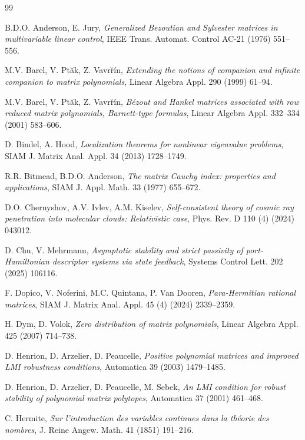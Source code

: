 \documentclass[12pt,reqno]{amsart}
\theoremstyle{plain}
\numberwithin{equation}{section}
\theoremstyle{remark}
\begin{document}
 

\begin{thebibliography}{99}

 B.D.O. Anderson, E. Jury, \textit{Generalized Bezoutian and Sylvester matrices in multivariable linear control}, IEEE Trans. Automat. Control AC-21 (1976) 551--556.

M.V. Barel, V. Pt\u{a}k, Z. Vavr\u{r}\'{i}n, \textit{Extending the notions of companion and infinite companion to matrix polynomials},
Linear Algebra Appl. 290 (1999) 61--94.

M.V. Barel, V. Pt\u{a}k, Z. Vavr\u{r}\'{i}n, 
\textit{B\'{e}zout and Hankel matrices associated with row reduced matrix polynomials, Barnett-type formulas}, Linear Algebra Appl. 332--334 (2001)  583--606.

D. Bindel, A. Hood,  \textit{Localization theorems for nonlinear eigenvalue
problems}, SIAM J. Matrix Anal. Appl. 34 (2013) 1728--1749.

 R.R. Bitmead, B.D.O. Anderson, \textit{The matrix Cauchy index: properties and
applications}, SIAM J. Appl. Math. 33 (1977) 655--672.


  D.O. Chernyshov, A.V. Ivlev, A.M. Kiselev,   \textit{Self-consistent theory of cosmic ray penetration into molecular clouds: Relativistic case}, Phys. Rev. D 110 (4) (2024) 043012.

 D. Chu, V. Mehrmann, \textit{Asymptotic stability and strict passivity of port-Hamiltonian descriptor systems via state feedback}, Systems Control Lett. 202 (2025) 106116.

 F. Dopico, V. Noferini, M.C. Quintana, P. Van Dooren, \textit{Para-Hermitian rational matrices}, SIAM J. Matrix Anal. Appl. 45 (4) (2024) 2339--2359.

H. Dym, D. Volok, \textit{Zero distribution of matrix polynomials}, Linear Algebra Appl. 425 (2007) 714--738.


 D. Henrion, D. Arzelier,  D. Peaucelle, \textit{Positive polynomial matrices and
improved LMI robustness conditions}, Automatica 39 (2003) 1479--1485.

 D. Henrion, D. Arzelier, D. Peaucelle, M. Sebek, \textit{An LMI condition for robust
stability of polynomial matrix polytopes}, Automatica 37 (2001) 461--468.

 C. Hermite, \textit{Sur l’introduction des variables continues dans la th\'{e}orie des nombres}, J. Reine Angew. Math. 41 (1851)
191--216.


\end{thebibliography}
\end{document}

